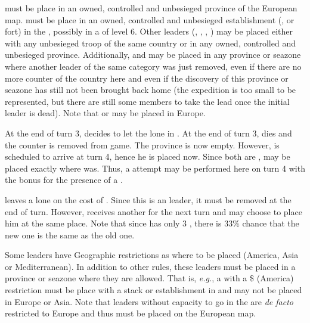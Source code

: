 \bparag \LeaderMis must be place in an owned, controlled and unbesieged
province of the European map.
\bparag \LeaderGov must be place in an owned, controlled and unbesieged
establishment (\COL, \TP or fort) in the \ROTW, possibly in a \COL of level 6.
\bparag Other leaders (\LeaderG, \LeaderA, \LeaderE, \LeaderC) may be placed
either with any unbesieged troop of the same country or in any owned,
controlled and unbesieged province.
\bparag Additionally, \LeaderE and \LeaderC may be placed in any province or
seazone where another leader of the same category was just removed, even if
there are no more counter of the country here and even if the discovery of
this province or seazone has still not been brought back home (the expedition
is too small to be represented, but there are still some members to take the
lead once the initial leader is dead).
\bparag Note that \LeaderE or \LeaderC may be placed in Europe.

\begin{exemple}
  At the end of turn 3, \HIS decides to let the lone  in
  \granderegionCuba. At the end of turn 3, \leaderColon dies and the counter
  is removed from game. The province is now empty. However,
   is scheduled to arrive at turn 4, hence he is placed
  now. Since both are \LeaderE, \leaderSolis may be placed exactly where
  \leaderColon was. Thus, a \COL attempt may be performed here on turn 4 with
  the bonus for the presence of a \LeaderE.

  \smallskip

  \ANG leaves a lone \anonyme\LeaderC on the cost of \continentAmerica. Since
  this is an \anonyme leader, it must be removed at the end of turn. However,
  \ANG receives another \anonyme \LeaderC for the next turn and may choose to
  place him at the same place. Note that since \ANG has only 3
  \anonyme\LeaderC, there is 33\% chance that the new one is the same as the
  old one.
\end{exemple}

 Some leaders have Geographic restrictions as
where to be placed (America, Asia or Mediterranean).
\bparag In addition to other rules, these leaders must be placed in a province
or seazone where they are allowed.
\bparag That is, \emph{e.g.}, a \LeaderG with a \$ (America) restriction must
be place with a stack or establishment in \continentAmerica and may not be
placed in Europe or Asia.
\bparag Note that leaders without capacity to go in the \ROTW are \emph{de
  facto} restricted to Europe and thus must be placed on the European map.

